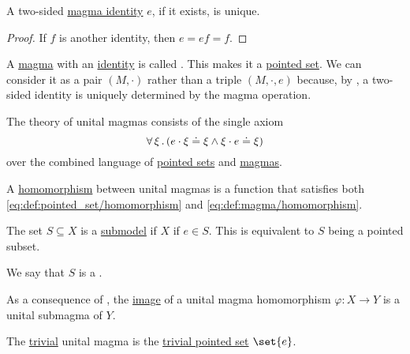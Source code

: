 \begin{proposition}\label{thm:magma_identity_unique}
  A two-sided \hyperref[def:magma_identity]{magma identity} \( e \), if it exists, is unique.
\end{proposition}
\begin{proof}
  If \( f \) is another identity, then \( e = ef = f \).
\end{proof}

\begin{definition}\label{def:unital_magma}
  A \hyperref[def:magma]{magma} with an \hyperref[def:magma_identity]{identity} is called . This makes it a \hyperref[def:pointed_set]{pointed set}. We can consider it as a pair \( (M, \cdot) \) rather than a triple \( (M, \cdot, e) \) because, by , a two-sided identity is uniquely determined by the magma operation.

  \begin{thmenum}
     The theory of unital magmas consists of the single axiom
    \begin{equation}\label{eq:def:unital_magma/theory/identity}
      \forall \thinspace \xi \thinspace . \thinspace (e \cdot \xi \doteq \xi \wedge \xi \cdot e \doteq \xi)
    \end{equation}
    over the combined language of \hyperref[def:pointed_set/theory]{pointed sets} and \hyperref[def:magma/theory]{magmas}.

     A \hyperref[def:first_order_homomorphism]{homomorphism} between unital magmas is a function that satisfies both \eqref{eq:def:pointed_set/homomorphism} and \eqref{eq:def:magma/homomorphism}.

     The set \( S \subseteq X \) is a \hyperref[thm:substructure_is_model]{submodel} if \( X \) if \( e \in S \). This is equivalent to \( S \) being a pointed subset.

    We say that \( S \) is a .

    As a consequence of , the \hyperref[def:multi_valued_function/image]{image} of a unital magma homomorphism \( \varphi: X \to Y \) is a unital submagma of \( Y \).

     The \hyperref[thm:substructures_form_complete_lattice/bottom]{trivial} unital magma is the \hyperref[def:pointed_set/trivial]{trivial pointed set} \( \set{ e } \).


\end{thmenum}
\end{definition}
